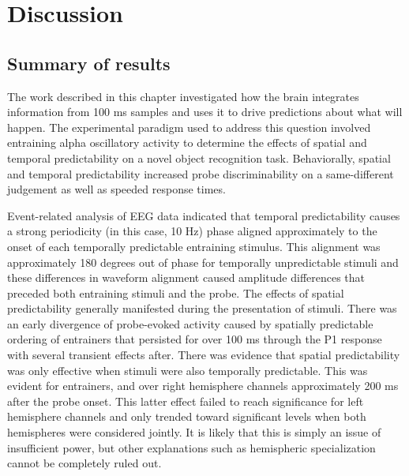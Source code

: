 \documentclass[dwyatte_dissertation.tex]{subfiles}
\begin{document}

\section{Discussion}

\subsection{Summary of results}
The work described in this chapter investigated how the brain integrates information from 100 ms samples and uses it to drive predictions about what will happen. The experimental paradigm used to address this question involved entraining alpha oscillatory activity to determine the effects of spatial and temporal predictability on a novel object recognition task. Behaviorally, spatial and temporal predictability increased probe discriminability on a same-different judgement as well as speeded response times. %

Event-related analysis of EEG data indicated that temporal predictability causes a strong periodicity (in this case, 10 Hz) phase aligned approximately to the onset of each temporally predictable entraining stimulus. This alignment was approximately 180 degrees out of phase for temporally unpredictable stimuli and these differences in waveform alignment caused amplitude differences that preceded both entraining stimuli and the probe. The effects of spatial predictability generally manifested during the presentation of stimuli. There was an early divergence of probe-evoked activity caused by spatially predictable ordering of entrainers that persisted for over 100 ms through the P1 response with several transient effects after. There was evidence that spatial predictability was only effective when stimuli were also temporally predictable. This was evident for entrainers, and over right hemisphere channels approximately 200 ms after the probe onset. This latter effect failed to reach significance for left hemisphere channels and only trended toward significant levels when both hemispheres were considered jointly. It is likely that this is simply an issue of insufficient power, but other explanations such as hemispheric specialization \cite[e.g.,]{Marsolek99,Dien09b} cannot be completely ruled out.
\end{document}
